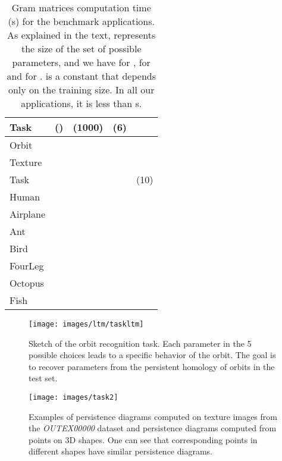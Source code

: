 \documentclass[11pt]{article}
\begin{document}
\begin{table}[t]
\vskip 0.15in
\begin{center}
\begin{small}
\begin{sc}
\begin{tabular}{|l|llll|}
\hline 
Task &          () &   (1000) &     (6) &         \\
\hline 
Orbit &         &        &      &                     \\        
Texture &       &         &     &                      \\                                           
\hline 
Task &          &               &            &            (10) \\
\hline 
Human &         &         &      &   \\
Airplane &      &       &    &     \\
Ant &           &       &      &     \\
Bird &          &       &    &     \\
FourLeg &       &        &      &     \\
Octopus &       &       &      &     \\
Fish &          &      &    &     \\
\hline                                                            
\end{tabular}

\end{sc}
\end{small}
\caption{\label{table:Gram} Gram matrices computation time (s) for the benchmark applications.
As explained in the text,  represents the size of the set of possible parameters, and we have  for , 
 for  and  for .  is a constant that depends only on the
training size. In all our applications, it is less than s.}
\end{center}
\vskip -0.1in
\end{table}

\begin{figure*}[t] 
\centering
\texttt{[image: images/ltm/taskltm]}
\caption{\label{fig:taskltm} Sketch of the orbit recognition task. Each parameter  in the 5 possible choices
leads to a specific behavior of the orbit. 
The goal is to recover parameters from the persistent homology of orbits in the test set.}
\end{figure*}

\begin{figure*}[t] 
\centering
\texttt{[image: images/task2]}
\caption{\label{fig:task2} Examples of persistence diagrams computed on texture images from the \emph{OUTEX00000} dataset
and persistence diagrams computed from points on 3D shapes. One can see that corresponding points in different shapes have
similar persistence diagrams.}
\end{figure*}
\end{document}
